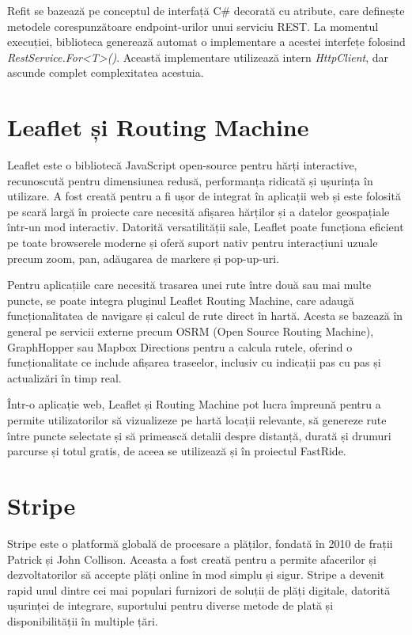 Refit se bazează pe conceptul de interfață C\# decorată cu atribute, care definește metodele corespunzătoare endpoint-urilor unui serviciu REST. La momentul execuției, biblioteca generează automat o implementare a acestei interfețe folosind \textit{RestService.For<T>()}. Această implementare utilizează intern \textit{HttpClient}, dar ascunde complet complexitatea acestuia. \parencite{refit}

\section{Leaflet și Routing Machine}

Leaflet este o bibliotecă JavaScript open-source pentru hărți interactive, recunoscută pentru dimensiunea redusă, performanța ridicată și ușurința în utilizare. A fost creată pentru a fi ușor de integrat în aplicații web și este folosită pe scară largă în proiecte care necesită afișarea hărților și a datelor geospațiale într-un mod interactiv. Datorită versatilității sale, Leaflet poate funcționa eficient pe toate browserele moderne și oferă suport nativ pentru interacțiuni uzuale precum zoom, pan, adăugarea de markere și pop-up-uri. \parencite{leaflet}

Pentru aplicațiile care necesită trasarea unei rute între două sau mai multe puncte, se poate integra pluginul Leaflet Routing Machine, care adaugă funcționalitatea de navigare și calcul de rute direct în hartă. Acesta se bazează în general pe servicii externe precum OSRM (Open Source Routing Machine), GraphHopper sau Mapbox Directions pentru a calcula rutele, oferind o funcționalitate ce include afișarea traseelor, inclusiv cu indicații pas cu pas și actualizări în timp real. \parencite{leaflet}

Într-o aplicație web, Leaflet și Routing Machine pot lucra împreună pentru a permite utilizatorilor să vizualizeze pe hartă locații relevante, să genereze rute între puncte selectate și să primească detalii despre distanță, durată și drumuri parcurse și totul gratis, de aceea se utilizează și în proiectul FastRide.

\section{Stripe}
Stripe este o platformă globală de procesare a plăților, fondată în 2010 de frații Patrick și
John Collison. Aceasta a fost creată pentru a permite afacerilor și dezvoltatorilor să accepte plăți
online în mod simplu și sigur. Stripe a devenit rapid unul dintre cei mai populari furnizori de
soluții de plăți digitale, datorită ușurinței de integrare, suportului pentru diverse metode de plată
și disponibilității în multiple țări. \parencite{stripe}

